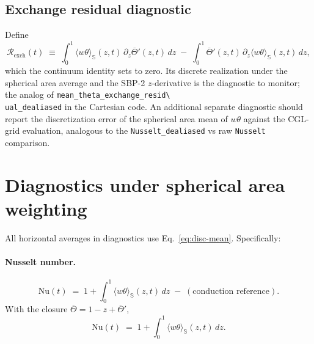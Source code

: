 \documentclass[11pt]{article}
\newcommand{\meanS}[1]{\langle #1 \rangle_{\mathbb{S}}}
\begin{document}
\subsection{Exchange residual diagnostic}

Define
\begin{equation}
  \mathcal{R}_{\mathrm{exch}}(t)
  \;\equiv\; \int_{0}^{1}\!\!\!\meanS{w\theta}(z, t)\,
  \partial_{z}\overline{\Theta}'(z, t)\,dz
  \;-\; \int_{0}^{1}\!\overline{\Theta}'(z, t)\,
  \partial_{z}\meanS{w\theta}(z, t)\,dz,
  \label{eq:exch-resid}
\end{equation}
which the continuum identity sets to zero.  Its discrete realization
under the spherical area average and the SBP-2 $z$-derivative is the
diagnostic to monitor; the analog of \verb|mean_theta_exchange_resid\
ual_dealiased| in the Cartesian code.  An additional separate
diagnostic should report the discretization error of the spherical
area mean of $w\theta$ against the CGL-grid evaluation, analogous to
the \verb|Nusselt_dealiased| vs raw \verb|Nusselt| comparison.

\section{Diagnostics under spherical area weighting}
\label{sec:diagnostics}

All horizontal averages in diagnostics use Eq.~\eqref{eq:disc-mean}.
Specifically:

\paragraph{Nusselt number.}
\begin{equation}
  \mathrm{Nu}(t)
  \;=\; 1 + \int_{0}^{1}\!\!\meanS{w\theta}(z, t)\,dz
  \;-\; (\text{conduction reference}).
\end{equation}
With the closure $\overline{\Theta} = 1 - z + \overline{\Theta}'$,
\begin{equation}
  \mathrm{Nu}(t) \;=\; 1 + \int_{0}^{1}\meanS{w\theta}(z, t)\,dz.
\end{equation}
\end{document}
